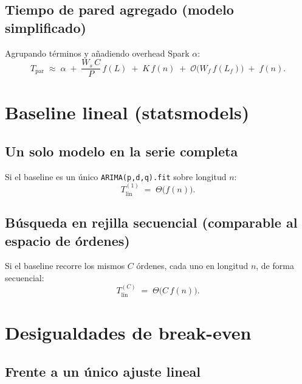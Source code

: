 \documentclass[11pt,a4paper]{article}
\begin{document}
\subsection{Tiempo de pared agregado (modelo simplificado)}

Agrupando términos y añadiendo overhead Spark $\alpha$:
\begin{equation}
  \label{eq:Tpar}
  T_{\mathrm{par}} \;\approx\;
  \alpha
  \;+\; \frac{W_s\, C}{P}\, f(L)
  \;+\; K\, f(n)
  \;+\; \mathcal{O}\!\big(W_f\, f(L_f)\big)
  \;+\; f(n) .
\end{equation}

\section{Baseline lineal (statsmodels)}

\subsection{Un solo modelo en la serie completa}

Si el baseline es un único \texttt{ARIMA(p,d,q).fit} sobre longitud $n$:
\begin{equation}
  \label{eq:Tlin1}
  T_{\mathrm{lin}}^{(1)} \;=\; \Theta\!\big(f(n)\big) .
\end{equation}

\subsection{Búsqueda en rejilla secuencial (comparable al espacio de órdenes)}

Si el baseline recorre los mismos $C$ órdenes, cada uno en longitud $n$, de
forma secuencial:
\begin{equation}
  \label{eq:TlinC}
  T_{\mathrm{lin}}^{(C)} \;=\; \Theta\!\big(C\, f(n)\big) .
\end{equation}

\section{Desigualdades de break-even}

\subsection{Frente a un único ajuste lineal}
\end{document}
